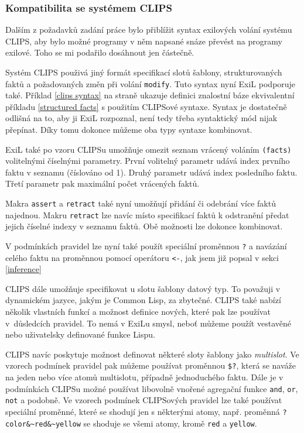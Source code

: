 \subsubsection{Kompatibilita se systémem CLIPS}

Dalším z požadavků zadání práce bylo přiblížit syntax exilových volání systému
CLIPS, aby bylo možné programy v něm napsané snáze převést na programy exilové.
Toho se mi podařilo dosáhnout jen částečně.

Systém CLIPS použivá jiný formát specifikací slotů šablony, strukturovaných
faktů a požadovaných změn při volání \verb|modify|. Tuto syntax nyní ExiL podporuje
také. Příklad \ref{clips syntax} na straně \pageref{clips syntax} ukazuje
definici znalostní báze ekvivalentní příkladu \ref{structured facts} s použitím
CLIPSové syntaxe. Syntax je dostatečně odlišná na to, aby ji ExiL rozpoznal,
není tedy třeba syntaktický mód nijak přepínat. Díky tomu dokonce můžeme oba
typy syntaxe kombinovat.

ExiL také po vzoru CLIPSu umožňuje omezit seznam vrácený voláním \verb|(facts)|
volitelnými číselnými parametry. První volitelný parametr udává index prvního
faktu v seznamu (číslováno od 1). Druhý parametr udává index posledního faktu.
Třetí parametr pak maximální počet vrácených faktů.

Makra \verb|assert| a \verb|retract| také nyní umožňují přidání či odebrání
více faktů najednou. Makru \verb|retract| lze navíc místo specifikací faktů k
odstranění předat jejich číselné indexy v seznamu faktů. Obě možnosti lze
dokonce kombinovat.

V podmínkách pravidel lze nyní také použít speciální proměnnou \verb|?| a
navázání celého faktu na proměnnou pomocí operátoru \verb|<-|, jak jsem již
popsal v sekci \ref{inference}

CLIPS dále umožňuje specifikovat u slotu šablony datový typ. To považuji v
dynamickém jazyce, jakým je Common Lisp, za zbytečné. CLIPS také nabízí několik
vlastních funkcí a možnost definice nových, které pak lze používat v~důsledcích
pravidel. To nemá v ExiLu smysl, neboť můžeme použít vestavěné nebo uživatelsky
definované funkce Lispu.

CLIPS navíc poskytuje možnost definovat některé sloty šablony jako
\emph{multislot}. Ve vzorech podmínek pravidel pak můžeme používat proměnnou
\verb|$?|, která se naváže na jeden nebo více atomů multislotu, případně
jednoduchého faktu. Dále je v podmínkách CLIPSu možné používat libovolně vnořené
agregační funkce \verb|and|, \verb|or|, \verb|not| a podobně. Ve vzorech
podmínek CLIPSových pravidel lze také používat speciální proměnné, které se
shodují jen s některými atomy, např. proměnná \verb|?color&~red&~yellow| se
shoduje se všemi atomy, kromě \verb|red| a \verb|yellow|.


